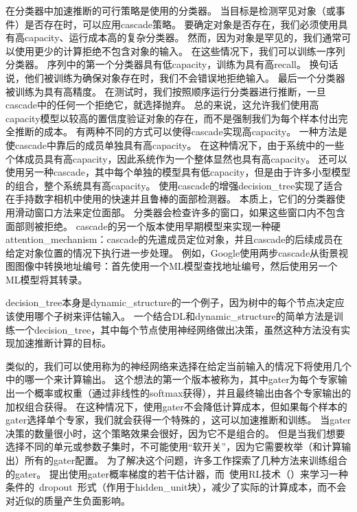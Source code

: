 在分类器中加速推断的可行策略是使用的分类器。
当目标是检测罕见对象（或事件）是否存在时，可以应用\gls{cascade}策略。
要确定对象是否存在，我们必须使用具有高\gls{capacity}、运行成本高的复杂分类器。 
然而，因为对象是罕见的，我们通常可以使用更少的计算拒绝不包含对象的输入。
在这些情况下，我们可以训练一序列分类器。
序列中的第一个分类器具有低\gls{capacity}，训练为具有高\gls{recall}。
换句话说，他们被训练为确保对象存在时，我们不会错误地拒绝输入。
最后一个分类器被训练为具有高精度。
在测试时，我们按照顺序运行分类器进行推断，一旦\gls{cascade}中的任何一个拒绝它，就选择抛弃。
总的来说，这允许我们使用高\gls{capacity}模型以较高的置信度验证对象的存在，而不是强制我们为每个样本付出完全推断的成本。
有两种不同的方式可以使得\gls{cascade}实现高\gls{capacity}。
一种方法是使\gls{cascade}中靠后的成员单独具有高\gls{capacity}。
在这种情况下，由于系统中的一些个体成员具有高\gls{capacity}，因此系统作为一个整体显然也具有高\gls{capacity}。
还可以使用另一种\gls{cascade}，其中每个单独的模型具有低\gls{capacity}，但是由于许多小型模型的组合，整个系统具有高\gls{capacity}。
\citet{Viola01}使用\gls{cascade}的增强\gls{decision_tree}实现了适合在手持数字相机中使用的快速并且鲁棒的面部检测器。
本质上，它们的分类器使用滑动窗口方法来定位面部。
分类器会检查许多的窗口，如果这些窗口内不包含面部则被拒绝。
\gls{cascade}的另一个版本使用早期模型来实现一种硬\gls{attention_mechanism}：\gls{cascade}的先遣成员定位对象，并且\gls{cascade}的后续成员在给定对象位置的情况下执行进一步处理。
例如，Google使用两步\gls{cascade}从街景视图图像中转换地址编号：首先使用一个\gls{ML}模型查找地址编号，然后使用另一个\gls{ML}模型将其转录\citep{Goodfellow+et+al-ICLR2014a}。

\gls{decision_tree}本身是\gls{dynamic_structure}的一个例子，因为树中的每个节点决定应该使用哪个子树来评估输入。
一个结合\gls{DL}和\gls{dynamic_structure}的简单方法是训练一个\gls{decision_tree}，其中每个节点使用神经网络做出决策\citep{guo1992classification}，虽然这种方法没有实现加速推断计算的目标。



类似的，我们可以使用称为的神经网络来选择在给定当前输入的情况下将使用几个中的哪一个来计算输出。
这个想法的第一个版本被称为\citep{Nowlan90,Jacobs-nc91}，其中\gls{gater}为每个专家输出一个概率或权重（通过非线性的\gls{softmax}获得），并且最终输出由各个专家输出的加权组合获得。
在这种情况下，使用\gls{gater}不会降低计算成本，但如果每个样本的\gls{gater}选择单个专家，我们就会获得一个特殊的\,\citep{collobert:2001:rr01-12,collobert:2002}，这可以加速推断和训练。
当\gls{gater}决策的数量很小时，这个策略效果会很好，因为它不是组合的。
但是当我们想要选择不同的单元或参数子集时，不可能使用``软开关''，因为它需要枚举（和计算输出）所有的\gls{gater}配置。
为了解决这个问题，许多工作探索了几种方法来训练组合的\gls{gater}。
\citet{bengio2013estimating}提出使用\gls{gater}概率梯度的若干估计器，而~\citet{Bacon-et-al-RLDM2015,BengioE-et-al-arXiv2015}使用\gls{RL}技术（）来学习一种条件的~\gls{dropout}~形式（作用于\gls{hidden_unit}块），减少了实际的计算成本，而不会对近似的质量产生负面影响。


